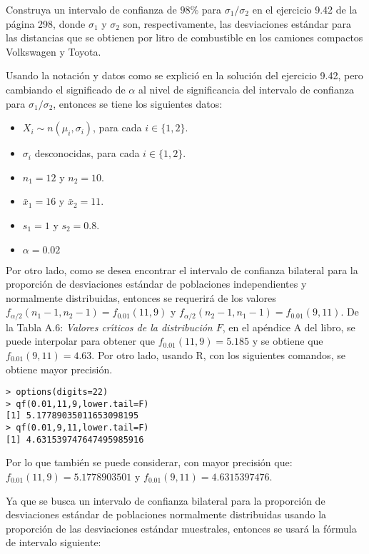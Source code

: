 \begin{enunciado}
 Construya un intervalo de confianza de $98\%$ para $\sigma_1/\sigma_2$ en el ejercicio 9.42 de la p\'agina 298, donde $\sigma_1$ y $\sigma_2$ son, respectivamente, las desviaciones est\'andar para las distancias que se obtienen por litro de combustible en los camiones compactos Volkswagen y Toyota.
\end{enunciado}

\begin{solucion}
 Usando la notaci\'on y datos como se explici\'o en la soluci\'on del ejercicio 9.42, pero cambiando el significado de $\alpha$ al nivel de significancia del intervalo de confianza para $\sigma_1/\sigma_2$, entonces se tiene los siguientes datos:
 \begin{itemize}
  \item $X_i \sim n\left( \mu_i, \sigma_i \right)$, para cada $i \in \{ 1, 2\}$.
  \item $\sigma_i$ desconocidas, para cada $i \in \{ 1, 2\}$.
  \item $n_1 = 12$ y $n_2 = 10$.
  \item $\bar{x}_1 = 16$ y $\bar{x}_2 = 11$.
  \item $s_1 = 1$ y $s_2 = 0.8$.
  \item $\alpha = 0.02$
 \end{itemize}
 Por otro lado, como se desea encontrar el intervalo de confianza bilateral para la proporci\'on de desviaciones est\'andar de poblaciones independientes y normalmente distribuidas, entonces se requerir\'a de los valores $f_{\alpha/2}(n_1-1,n_2-1) = f_{0.01}(11,9)$ y $f_{\alpha/2}(n_2-1,n_1-1) = f_{0.01}(9,11)$. De la Tabla A.6: \textit{Valores cr\'{\i}ticos de la distribuci\'on $F$}, en el ap\'endice A del libro, se puede interpolar para obtener que $f_{0.01}(11,9) = 5.185$ y se obtiene que $f_{0.01}(9,11) = 4.63$. Por otro lado, usando R, con los siguientes comandos, se obtiene mayor precisi\'on.
 \begin{verbatim}
> options(digits=22)
> qf(0.01,11,9,lower.tail=F)
[1] 5.17789035011653098195
> qf(0.01,9,11,lower.tail=F)
[1] 4.631539747647495985916
 \end{verbatim}
 \vspace{-0.5cm}
 Por lo que tambi\'en se puede considerar, con mayor precisi\'on que: $f_{0.01}(11,9) = 5.1778903501$ y $f_{0.01}(9,11) = 4.6315397476$.
 \par 
 Ya que se busca un intervalo de confianza bilateral para la proporci\'on de desviaciones est\'andar de poblaciones normalmente distribuidas usando la proporci\'on de las desviaciones est\'andar muestrales, entonces se usar\'a la f\'ormula de intervalo siguiente:

\end{solucion}
